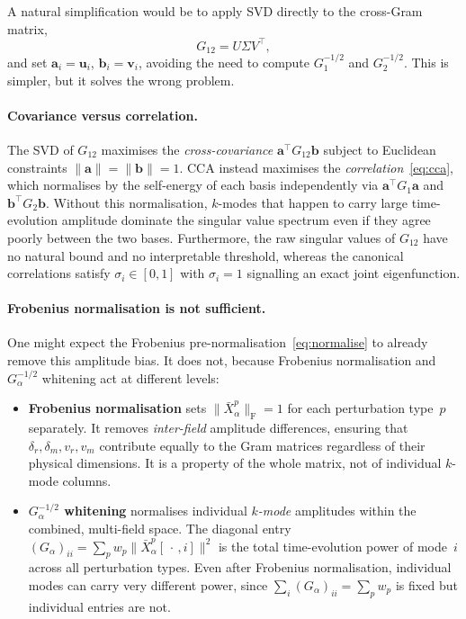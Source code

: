 \documentclass[a4paper,11pt]{article}
\newcommand{\va}{\bm{a}}
\newcommand{\vb}{\bm{b}}
\newcommand{\vu}{\bm{u}}
\newcommand{\vv}{\bm{v}}
\newcommand{\Xn}[2]{\bar{X}_{#1}^{#2}}
\newcommand{\Gb}[1]{G_{#1}}
\theoremstyle{plain}
\begin{document}
A natural simplification would be to apply SVD directly to the cross-Gram matrix,
\begin{equation}
    \Gb{12} = U\Sigma V^\top,
    \label{eq:svd-G12-simple}
\end{equation}
and set $\va_i = \vu_i$, $\vb_i = \vv_i$, avoiding the need to compute $\Gb{1}^{-1/2}$
and $\Gb{2}^{-1/2}$.
This is simpler, but it solves the wrong problem.

\paragraph{Covariance versus correlation.}
The SVD of $\Gb{12}$ maximises the \emph{cross-covariance}
$\va^\top \Gb{12}\vb$ subject to Euclidean constraints $\|\va\|=\|\vb\|=1$.
CCA instead maximises the \emph{correlation}~\eqref{eq:cca}, which normalises by the
self-energy of each basis independently via $\va^\top \Gb{1}\va$ and $\vb^\top \Gb{2}\vb$.
Without this normalisation, $k$-modes that happen to carry large time-evolution amplitude
dominate the singular value spectrum even if they agree poorly between the two bases.
Furthermore, the raw singular values of $\Gb{12}$ have no natural bound and no
interpretable threshold, whereas the canonical correlations satisfy $\sigma_i\in[0,1]$
with $\sigma_i=1$ signalling an exact joint eigenfunction.

\paragraph{Frobenius normalisation is not sufficient.}
One might expect the Frobenius pre-normalisation~\eqref{eq:normalise} to already remove
this amplitude bias.
It does not, because Frobenius normalisation and $\Gb{\alpha}^{-1/2}$ whitening act at
different levels:
\begin{itemize}
    \item \textbf{Frobenius normalisation} sets $\|\Xn{\alpha}{p}\|_{\mathrm{F}}=1$ for
    each perturbation type~$p$ separately.
    It removes \emph{inter-field} amplitude differences, ensuring that
    $\delta_r,\delta_m,v_r,v_m$ contribute equally to the Gram matrices regardless of
    their physical dimensions.
    It is a property of the whole matrix, not of individual $k$-mode columns.
    \item \textbf{$\Gb{\alpha}^{-1/2}$ whitening} normalises individual \emph{$k$-mode}
    amplitudes within the combined, multi-field space.
    The diagonal entry $(\Gb{\alpha})_{ii}=\sum_p w_p\|\Xn{\alpha}{p}[\,\cdot\,,i]\|^2$
    is the total time-evolution power of mode~$i$ across all perturbation types.
    Even after Frobenius normalisation, individual modes can carry very different power,
    since $\sum_i(\Gb{\alpha})_{ii}=\sum_p w_p$ is fixed but individual entries are not.
\end{itemize}
\end{document}
